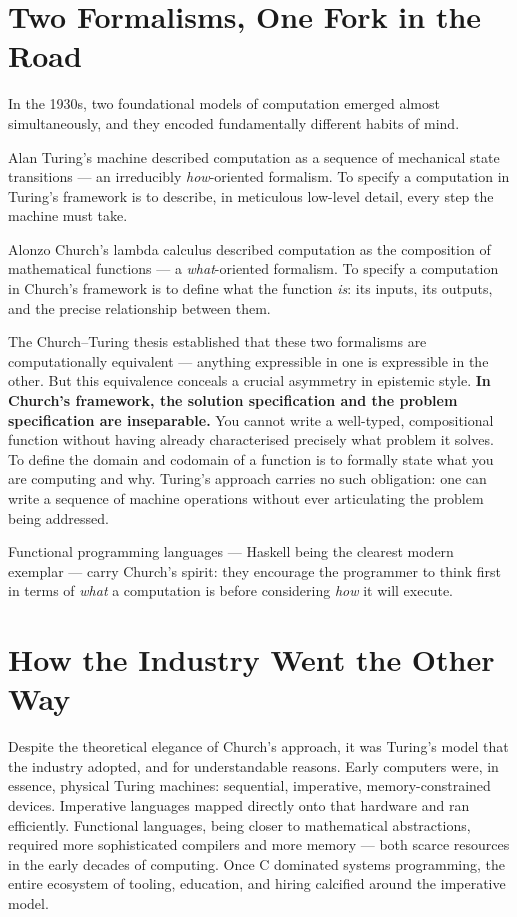 \documentclass[12pt]{article}
\begin{document}
\section{Two Formalisms, One Fork in the Road}

In the 1930s, two foundational models of computation emerged almost
simultaneously, and they encoded fundamentally different habits of mind.

Alan Turing's machine described computation as a sequence of mechanical state
transitions --- an irreducibly \emph{how}-oriented formalism. To specify a
computation in Turing's framework is to describe, in meticulous low-level
detail, every step the machine must take.

Alonzo Church's lambda calculus described computation as the composition of
mathematical functions --- a \emph{what}-oriented formalism. To specify a
computation in Church's framework is to define what the function \emph{is}:
its inputs, its outputs, and the precise relationship between them.

The Church--Turing thesis established that these two formalisms are
computationally equivalent --- anything expressible in one is expressible in
the other. But this equivalence conceals a crucial asymmetry in epistemic
style. \textbf{In Church's framework, the solution specification and the
problem specification are inseparable.} You cannot write a well-typed,
compositional function without having already characterised precisely what
problem it solves. To define the domain and codomain of a function is to
formally state what you are computing and why. Turing's approach carries no
such obligation: one can write a sequence of machine operations without ever
articulating the problem being addressed.

Functional programming languages --- Haskell being the clearest modern
exemplar --- carry Church's spirit: they encourage the programmer to think
first in terms of \emph{what} a computation is before considering \emph{how}
it will execute.

\section{How the Industry Went the Other Way}

Despite the theoretical elegance of Church's approach, it was Turing's model
that the industry adopted, and for understandable reasons. Early computers
were, in essence, physical Turing machines: sequential, imperative,
memory-constrained devices. Imperative languages mapped directly onto that
hardware and ran efficiently. Functional languages, being closer to
mathematical abstractions, required more sophisticated compilers and more
memory --- both scarce resources in the early decades of computing. Once C
dominated systems programming, the entire ecosystem of tooling, education,
and hiring calcified around the imperative model.
\end{document}
